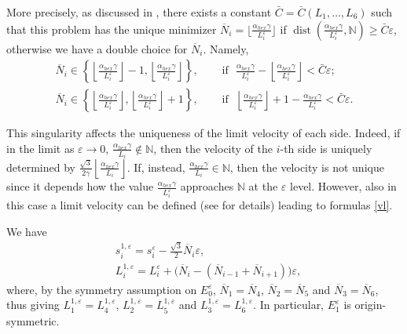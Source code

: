 \documentclass{interact}
\numberwithin{equation}{section}
\theoremstyle{definition}
\renewcommand{\epsilon}{\varepsilon}
\DeclareMathOperator{\dist}{dist}
\begin{document}
More precisely, as discussed in \cite[p. 480]{BGN}, there exists a constant $\bar{C}=\bar{C}(L_1,\dots,L_6)$ such that this problem has the unique minimizer $\overline{N}_i=\lfloor\frac{\alpha_{hex}\gamma}{L_i^\epsilon}\rfloor$ if $\dist\left(\frac{\alpha_{hex}\gamma}{L_i^\epsilon},\mathbb{N}\right)\geq \bar{C}\epsilon$, otherwise we have a double choice for $\overline{N}_i$. Namely,
\begin{equation*}
\begin{split}
\overline{N}_i\in\left\{\left\lfloor\frac{\alpha_{hex}\gamma}{L_i^\epsilon}\right\rfloor-1,\left\lfloor\frac{\alpha_{hex}\gamma}{L_i^\epsilon}\right\rfloor\right\}, &\quad{\mbox{ if }}\,\,\frac{\alpha_{hex}\gamma}{L_i^\epsilon}-\left\lfloor\frac{\alpha_{hex}\gamma}{L_i^\epsilon}\right\rfloor< \bar{C}\epsilon;\\
\overline{N}_i\in\left\{\left\lfloor\frac{\alpha_{hex}\gamma}{L_i^\epsilon}\right\rfloor,\left\lfloor\frac{\alpha_{hex}\gamma}{L_i^\epsilon}\right\rfloor+1\right\}, &\quad{\mbox{ if }}\,\,\left\lfloor\frac{\alpha_{hex}\gamma}{L_i^\epsilon}\right\rfloor+1-\frac{\alpha_{hex}\gamma}{L_i^\epsilon}< \bar{C}\epsilon.
\end{split}
\end{equation*}

This singularity affects the uniqueness of the limit velocity of each side. Indeed, if in the limit as $\epsilon\to0$, $\frac{\alpha_{hex}\gamma}{L_i}\not\in\mathbb{N}$, then the velocity of the $i$-th side is uniquely determined by $\frac{\sqrt{3}}{2\gamma}\left\lfloor\frac{\alpha_{hex}\gamma}{L_i}\right\rfloor$. If, instead, $\frac{\alpha_{hex}\gamma}{L_i}\in\mathbb{N}$, then the velocity is not unique since it depends how the value $\frac{\alpha_{hex}\gamma}{L_i^\epsilon}$ approaches $\mathbb{N}$ at the $\epsilon$ level. However, also in this case a limit velocity can be defined (see \cite{BGN} for details) leading to formulas \eqref{vl}.

We have
\begin{eqnarray*}
&s_i^{1,\epsilon}=s_i^{\epsilon}-\frac{\sqrt3}{2}\overline{N}_{i}\epsilon,\\
&L_i^{1,\epsilon}=L_i^{\epsilon}+\bigl(\overline{N}_{i}-(\overline{N}_{i-1}+\overline{N}_{i+1})\bigr)\epsilon, 
\end{eqnarray*}
where, by the symmetry assumption on $E_0^\epsilon$, $\overline{N}_{1}=\overline{N}_{4}$, $\overline{N}_{2}=\overline{N}_{5}$ and $\overline{N}_{3}=\overline{N}_{6}$, thus giving $L_1^{1,\epsilon}=L_4^{1,\epsilon}$, $L_2^{1,\epsilon}=L_5^{1,\epsilon}$ and $L_3^{1,\epsilon}=L_6^{1,\epsilon}$. In particular, $E_1^\epsilon$ is origin-symmetric.
\end{document}
